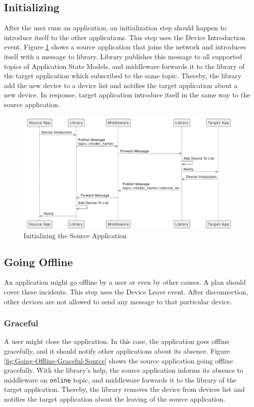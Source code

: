 \subsection{Initializing}
After the user runs an application, an initialization step should happen to introduce itself to the other applications. This step uses the Device Introduction event. Figure \ref{fig:Initializing} shows a source application that joins the network and introduces itself with a message to library. Library publishes this message to all supported topics of Application State Models, and middleware forwards it to the library of the target application which subscribed to the same topic. Thereby, the library add the new device to a device list and notifies the target application about a new device. In response, target application introduce itself in the same way to the source application.



\FloatBarrier \begin{figure}[H]
    \includegraphics[width=\linewidth]{../figures/Initializing.pdf}
    \centering
    \caption{Initializing the Source Application}
    \label{fig:Initializing}
\end{figure} \FloatBarrier

\subsection{Going Offline}
An application might go offline by a user or even by other causes. A plan should cover these incidents. This step uses the Device Leave event. After disconnection, other devices are not allowed to send any message to that particular device.

\subsubsection{Graceful}
A user might close the application. In this case, the application goes offline gracefully, and it should notify other applications about its absence. Figure \ref{fig:Going-Offline-Graceful-Source} shows the source application going offline gracefully. With the library's help, the source application informs its absence to middleware on \lstinline[basicstyle=\ttfamily]{online} topic, and middleware forwards it to the library of the target application. Thereby, the library removes the device from devices list and notifies the target application about the leaving of the source application. 

